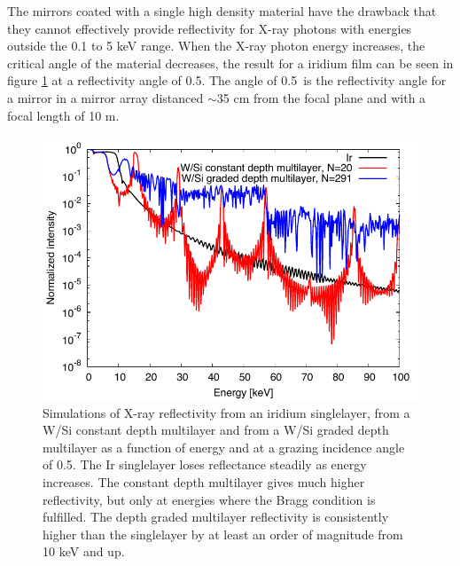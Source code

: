 %
The mirrors coated with a single high density material have the drawback that they cannot effectively provide reflectivity for X-ray photons with energies outside the 0.1 to 5 keV range. When the X-ray photon energy increases, the critical angle of the material decreases, the result for a iridium film can be seen in figure \ref{fig:sl-ml-comp} at a reflectivity angle of 0.5\degr. The angle of 0.5\degr\ is the reflectivity angle for a mirror in a mirror array distanced $\sim$35 cm from the focal plane and with a focal length of 10 m.

\begin{figure}[!ht] %
	\centering	\includegraphics[width=0.8\linewidth]{figures/introduction/sl-ml-comp.pdf}
	\caption{\footnotesize Simulations of X-ray reflectivity from an iridium singlelayer, from a W/Si constant depth multilayer and from a W/Si graded depth multilayer as a function of energy and at a grazing incidence angle of 0.5\degr. The Ir singlelayer loses reflectance steadily as energy increases. The constant depth multilayer gives much higher reflectivity, but only at energies where the Bragg condition is fulfilled. The depth graded multilayer reflectivity is consistently higher than the singlelayer by at least an order of magnitude from 10 keV and up.}
	\label{fig:sl-ml-comp}
\end{figure}

